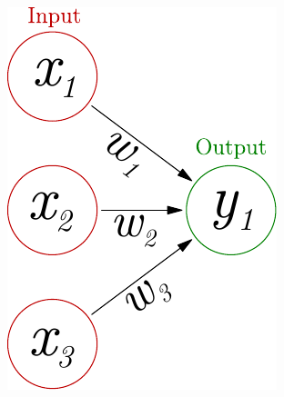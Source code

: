 \documentclass{beamer}
\begin{document}
\begin{frame}
\begin{columns}[T]
\begin{column}{.5\textwidth}
\begin{figure}
 \includegraphics[width=0.9\linewidth]{./fig/perceptron_maths.pdf}
\end{figure}
    \end{column}
  \end{columns}
\end{frame}
\end{document}

